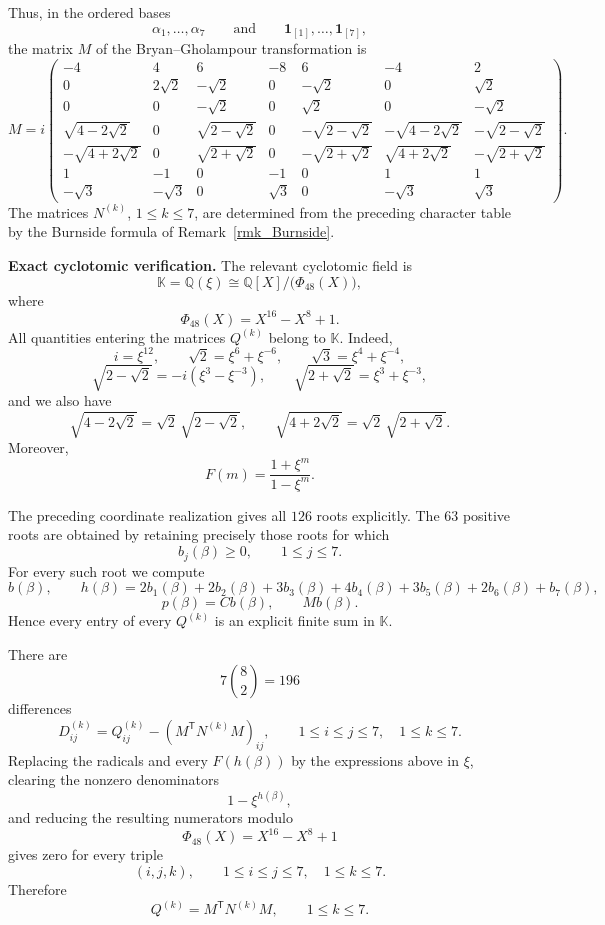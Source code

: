 \documentclass[a4paper,reqno]{amsart}
\theoremstyle{plain} %
\theoremstyle{definition} %
\theoremstyle{remark} %
\newcommand{\1}{\mathds{1}}   %
\begin{document}
Thus, in the ordered bases
\[
\alpha_1,\ldots,\alpha_7
\qquad\text{and}\qquad
\mathbf1_{[1]},\ldots,\mathbf1_{[7]},
\]
the matrix \(M\) of the Bryan--Gholampour transformation is
\[
M
=
i
\begin{pmatrix}
-4&4&6&-8&6&-4&2\\
0&2\sqrt2&-\sqrt2&0&-\sqrt2&0&\sqrt2\\
0&0&-\sqrt2&0&\sqrt2&0&-\sqrt2\\
\sqrt{4-2\sqrt2}&0&\sqrt{2-\sqrt2}&0&
-\sqrt{2-\sqrt2}&-\sqrt{4-2\sqrt2}&-\sqrt{2-\sqrt2}\\
-\sqrt{4+2\sqrt2}&0&\sqrt{2+\sqrt2}&0&
-\sqrt{2+\sqrt2}&\sqrt{4+2\sqrt2}&-\sqrt{2+\sqrt2}\\
1&-1&0&-1&0&1&1\\
-\sqrt3&-\sqrt3&0&\sqrt3&0&-\sqrt3&\sqrt3
\end{pmatrix}.
\]
The matrices \(N^{(k)}\), \(1\le k\le7\), are determined from the
preceding character table by the Burnside formula of Remark~\ref{rmk_Burnside}.

\medskip

\noindent\textbf{Exact cyclotomic verification.}
The relevant cyclotomic field is
\[
\mathbb K
=
\mathbb Q(\xi)
\cong
\mathbb Q[X]/\bigl(\Phi_{48}(X)\bigr),
\]
where
\[
\Phi_{48}(X)=X^{16}-X^8+1.
\]
All quantities entering the matrices \(Q^{(k)}\) belong to
\(\mathbb K\).  Indeed,
\[
i=\xi^{12},
\qquad
\sqrt2=\xi^6+\xi^{-6},
\qquad
\sqrt3=\xi^4+\xi^{-4},
\]
\[
\sqrt{2-\sqrt2}
=
-i(\xi^3-\xi^{-3}),
\qquad
\sqrt{2+\sqrt2}
=
\xi^3+\xi^{-3},
\]
and we also have
\[
\sqrt{4-2\sqrt2}
=
\sqrt2\,\sqrt{2-\sqrt2},
\qquad
\sqrt{4+2\sqrt2}
=
\sqrt2\,\sqrt{2+\sqrt2}.
\]
Moreover,
\[
F(m)
=
\frac{1+\xi^m}{1-\xi^m}.
\]

The preceding coordinate realization gives all \(126\) roots
explicitly.  The \(63\) positive roots are obtained by retaining
precisely those roots for which
\[
b_j(\beta)\ge0,
\qquad
1\le j\le7.
\]
For every such root we compute
\[
b(\beta),
\qquad
h(\beta)
=
2b_1(\beta)+2b_2(\beta)+3b_3(\beta)+4b_4(\beta)
+3b_5(\beta)+2b_6(\beta)+b_7(\beta),
\]
\[
p(\beta)=Cb(\beta),
\qquad
Mb(\beta).
\]
Hence every entry of every \(Q^{(k)}\) is an explicit finite sum in
\(\mathbb K\).

There are
\[
7\binom82=196
\]
differences
\[
D_{ij}^{(k)}
=
Q_{ij}^{(k)}
-
\left(M^{\mathsf T}N^{(k)}M\right)_{ij},
\qquad
1\le i\le j\le7,
\quad
1\le k\le7.
\]
Replacing the radicals and every \(F(h(\beta))\) by the expressions
above in \(\xi\), clearing the nonzero denominators
\[
1-\xi^{h(\beta)},
\]
and reducing the resulting numerators modulo
\[
\Phi_{48}(X)=X^{16}-X^8+1
\]
gives zero for every triple
\[
(i,j,k),
\qquad
1\le i\le j\le7,
\quad
1\le k\le7.
\]
Therefore
\[
Q^{(k)}
=
M^{\mathsf T}N^{(k)}M,
\qquad
1\le k\le7.
\]
\end{document}
